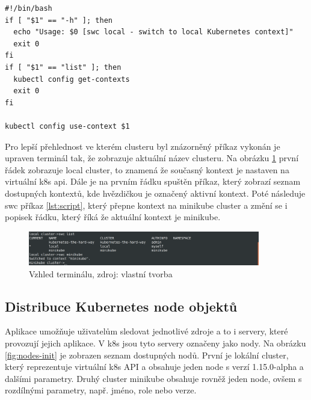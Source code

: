 \begin{lstlisting}[caption={Bash skript pro práci s k8s kontexty},label=lst:script]
#!/bin/bash
if [ "$1" == "-h" ]; then
  echo "Usage: $0 [swc local - switch to local Kubernetes context]"
  exit 0
fi
if [ "$1" == "list" ]; then
  kubectl config get-contexts
  exit 0
fi

kubectl config use-context $1
\end{lstlisting}

    Pro lepší přehlednost ve kterém clusteru byl znázorněný příkaz vykonán je upraven terminál tak, že zobrazuje aktuální název clusteru. Na obrázku \ref{fig:prompt} první řádek zobrazuje local cluster, to znamená že současný kontext je nastaven na virtuální k8s api. Dále je na prvním řádku spuštěn příkaz, který zobrazí seznam dostupných kontextů, kde hvězdičkou je označený aktivní kontext. Poté následuje swc příkaz \ref{lst:script}, který přepne kontext na minikube cluster a změní se i popisek řádku, který říká že aktuální kontext je minikube.\par

\begin{figure}[H]
  \begin{centering}
    
	  \includegraphics[width=0.9\textwidth]{images/prompt.png}
    \par
	  \caption{Vzhled terminálu\label{fig:prompt}, zdroj: vlastní tvorba}
    \end{centering}
\end{figure}

\subsection{Distribuce Kubernetes node objektů}
    Aplikace umožňuje uživatelům sledovat jednotlivé zdroje a to i servery, které provozují jejich aplikace. V k8s jsou tyto servery označeny jako nody. Na obrázku \ref{fig:nodes-init} je zobrazen seznam dostupných nodů. První je lokální cluster, který reprezentuje virtuální k8s API a obsahuje jeden node s verzí 1.15.0-alpha a dalšími parametry. Druhý cluster minikube obsahuje rovněž jeden node, ovšem s rozdílnými parametry, např. jméno, role nebo verze.\par

